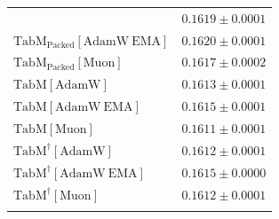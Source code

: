 \begin{longtable}{p{}p{}}
{\begin{tabular}{ll}
{\footnotesize $\mathrm{TabM_{\text{Packed}}[AdamW]}$ } & {\footnotesize$0.1619 \pm 0.0001$}\\ 
{\footnotesize $\mathrm{TabM_{\text{Packed}}[AdamW\ EMA]}$ } & {\footnotesize$0.1620 \pm 0.0001$}\\ 
{\footnotesize $\mathrm{TabM_{\text{Packed}}[Muon]}$ } & {\footnotesize$0.1617 \pm 0.0002$}\\ 
{\footnotesize $\mathrm{TabM[AdamW]}$ } & {\footnotesize$0.1613 \pm 0.0001$}\\ 
{\footnotesize $\mathrm{TabM[AdamW\ EMA]}$ } & {\footnotesize$0.1615 \pm 0.0001$}\\ 
{\footnotesize $\mathrm{TabM[Muon]}$ } & {\footnotesize$0.1611 \pm 0.0001$}\\ 
{\footnotesize $\mathrm{TabM^\dagger[AdamW]}$ } & {\footnotesize$0.1612 \pm 0.0001$}\\ 
{\footnotesize $\mathrm{TabM^\dagger[AdamW\ EMA]}$ } & {\footnotesize$0.1615 \pm 0.0000$}\\ 
{\footnotesize $\mathrm{TabM^\dagger[Muon]}$ } & {\footnotesize$0.1612 \pm 0.0001$}\\ 
\bottomrule
\end{tabular}}

&

\topalign{
\centering
\setlength\tabcolsep{2.5pt}
\renewcommand{\arraystretch}{0.8}
\begin{tabular}{ll}


\end{tabular}}
\end{longtable}
